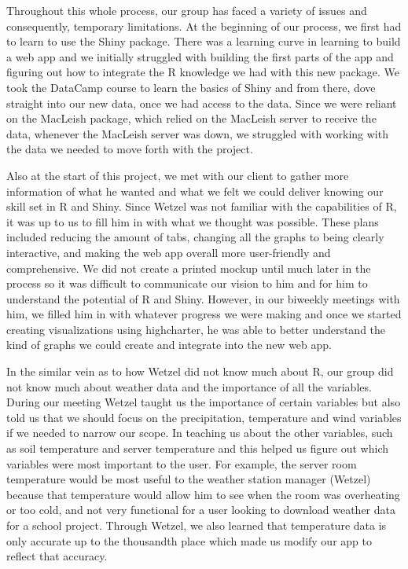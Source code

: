\documentclass[10pt,letterpaper]{article}
\begin{document}
Throughout this whole process, our group has faced a variety of issues
and consequently, temporary limitations. At the beginning of our
process, we first had to learn to use the Shiny package. There was a
learning curve in learning to build a web app and we initially struggled
with building the first parts of the app and figuring out how to
integrate the R knowledge we had with this new package. We took the
DataCamp course to learn the basics of Shiny and from there, dove
straight into our new data, once we had access to the data. Since we
were reliant on the MacLeish package, which relied on the MacLeish
server to receive the data, whenever the MacLeish server was down, we
struggled with working with the data we needed to move forth with the
project.

Also at the start of this project, we met with our client to gather more
information of what he wanted and what we felt we could deliver knowing
our skill set in R and Shiny. Since Wetzel was not familiar with the
capabilities of R, it was up to us to fill him in with what we thought
was possible. These plans included reducing the amount of tabs, changing
all the graphs to being clearly interactive, and making the web app
overall more user-friendly and comprehensive. We did not create a
printed mockup until much later in the process so it was difficult to
communicate our vision to him and for him to understand the potential of
R and Shiny. However, in our biweekly meetings with him, we filled him
in with whatever progress we were making and once we started creating
visualizations using highcharter, he was able to better understand the
kind of graphs we could create and integrate into the new web app.

In the similar vein as to how Wetzel did not know much about R, our
group did not know much about weather data and the importance of all the
variables. During our meeting Wetzel taught us the importance of certain
variables but also told us that we should focus on the precipitation,
temperature and wind variables if we needed to narrow our scope. In
teaching us about the other variables, such as soil temperature and
server temperature and this helped us figure out which variables were
most important to the user. For example, the server room temperature
would be most useful to the weather station manager (Wetzel) because
that temperature would allow him to see when the room was overheating or
too cold, and not very functional for a user looking to download weather
data for a school project. Through Wetzel, we also learned that
temperature data is only accurate up to the thousandth place which made
us modify our app to reflect that accuracy.
\end{document}
